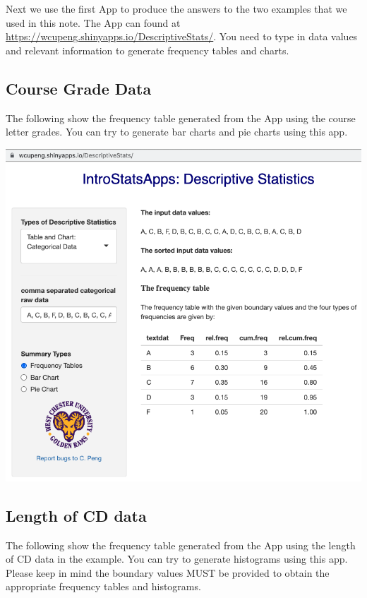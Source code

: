 \documentclass[
]{book}
\begin{document}
Next we use the first App to produce the answers to the two examples that we used in this note. The App can found at \url{https://wcupeng.shinyapps.io/DescriptiveStats/}. You need to type in data values and relevant information to generate frequency tables and charts.

\hypertarget{course-grade-data}{%
\subsection{Course Grade Data}\label{course-grade-data}}

The following show the frequency table generated from the App using the course letter grades. You can try to generate bar charts and pie charts using this app.

\begin{center}\includegraphics[width=0.8\linewidth]{week01/cateFreq} \end{center}

\hypertarget{length-of-cd-data}{%
\subsection{Length of CD data}\label{length-of-cd-data}}

The following show the frequency table generated from the App using the length of CD data in the example. You can try to generate histograms using this app. Please keep in mind the boundary values MUST be provided to obtain the appropriate frequency tables and histograms.
\end{document}
